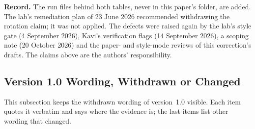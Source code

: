 \documentclass[11pt,a4paper]{article}
\begin{document}
\textbf{Record.} The run files behind both tables, never in this paper's
folder, are added. The lab's remediation plan of 23 June 2026 recommended
withdrawing the rotation claim; it was not applied. The defects were
raised again by the lab's style gate (4 September 2026), Kavi's
verification flags (14 September 2026), a scoping note (20 October 2026)
and the paper- and style-mode reviews of this correction's drafts. The
claims above are the authors' responsibility.

\subsection{Version 1.0 Wording, Withdrawn or Changed}
\label{app:record}

This subsection keeps the withdrawn wording of version~1.0 visible. Each
item quotes it verbatim and says where the evidence is; the last items
list other wording that changed.
\end{document}

